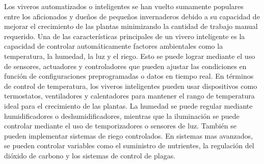 Los viveros automatizados o inteligentes se han vuelto sumamente populares entre los aficionados y dueños de pequeños invernaderos debido a su capacidad de mejorar el crecimiento de las plantas minimizando la cantidad de trabajo manual requerido. Una de las características principales de un vivero inteligente es la capacidad de controlar automáticamente factores ambientales como la temperatura, la humedad, la luz y el riego. Esto se puede lograr mediante el uso de sensores, actuadores y controladores que pueden ajustar las condiciones en función de configuraciones preprogramadas o datos en tiempo real. 
En términos de control de temperatura, los viveros inteligentes pueden usar dispositivos como termostatos, ventiladores y calentadores para mantener el rango de temperatura ideal para el crecimiento de las plantas. La humedad se puede regular mediante humidificadores o deshumidificadores, mientras que la iluminación se puede controlar mediante el uso de temporizadores o sensores de luz. También se pueden implementar sistemas de riego controlados. En sistemas mas avanzados, se pueden controlar variables como el suministro de nutrientes, la regulación del dióxido de carbono y los sistemas de control de plagas. 




%


